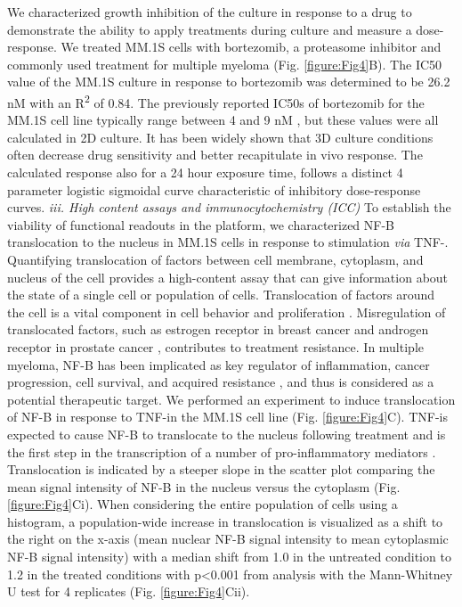 We characterized growth inhibition of the culture in response to a drug to demonstrate the ability to apply treatments during culture and measure a dose-response. We treated MM.1S cells with bortezomib, a proteasome inhibitor and commonly used treatment for multiple myeloma (Fig. \ref{figure:Fig4}B). The IC50 value of the MM.1S culture in response to bortezomib was determined to be 26.2 nM with an R\textsuperscript{2} of 0.84. The previously reported IC50s of bortezomib for the MM.1S cell line typically range between 4 and 9 nM \cite{Bianchi2006, Hu2014, Horton2006}, but these values were all calculated in 2D culture. It has been widely shown that 3D culture conditions often decrease drug sensitivity \cite{Tung2011, Friedrich2009}and better recapitulate in vivo response. The calculated response also for a 24 hour exposure time, follows a distinct 4 parameter logistic sigmoidal curve characteristic of inhibitory dose-response curves. 
\newline
\textit{iii. High content assays and immunocytochemistry (ICC)} To establish the viability of functional readouts in the platform, we characterized NF-\textkappa B translocation to the nucleus in MM.1S cells in response to stimulation \textit{via} TNF-\textalpha. Quantifying translocation of factors between cell membrane, cytoplasm, and nucleus of the cell provides a high-content assay that can give information about the state of a single cell or population of cells. Translocation of factors around the cell is a vital component in cell behavior and proliferation \cite{Chuderland2008}. Misregulation of translocated factors, such as estrogen receptor in breast cancer \cite{Revankar2005} and androgen receptor in prostate cancer \cite{Molina2011}, contributes to treatment resistance. In multiple myeloma, NF-\textkappa B has been implicated as key regulator of inflammation, cancer progression, cell survival, and acquired resistance \cite{hideshima2000thalidomide}, and thus is considered as a potential therapeutic target. 
We performed an experiment to induce translocation of NF-\textkappa B in response to TNF-\textalpha  in the MM.1S cell line (Fig. \ref{figure:Fig4}C). TNF-\textalpha  is expected to cause NF-\textkappa B to translocate to the nucleus following treatment and is the first step in the transcription of a number of pro-inflammatory mediators \cite{Pahl1999}. Translocation is indicated by a steeper slope in the scatter plot comparing the mean signal intensity of NF-\textkappa B in the nucleus versus the cytoplasm (Fig. \ref{figure:Fig4}Ci). When considering the entire population of cells using a histogram, a population-wide increase in translocation is visualized as a shift to the right on the x-axis (mean nuclear NF-\textkappa B signal intensity to mean cytoplasmic NF-\textkappa B signal intensity) with a median shift from 1.0 in the untreated condition to 1.2 in the treated conditions with p<0.001 from analysis with the Mann-Whitney U test for 4 replicates (Fig. \ref{figure:Fig4}Cii).

